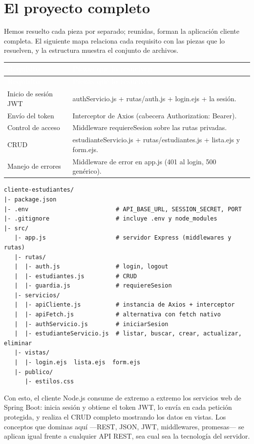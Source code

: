 \documentclass[11pt]{article}
\begin{document}
\section{El proyecto completo}
Hemos resuelto cada pieza por separado; reunidas, forman la aplicación cliente completa. El siguiente mapa relaciona cada requisito con las piezas que lo resuelven, y la estructura muestra el conjunto de archivos.

{\renewcommand{\arraystretch}{1.25}
\begin{longtable}{>{\raggedright\arraybackslash}p{3.6cm} >{\raggedright\arraybackslash}p{11.8cm}}
\rowcolor{ndverde}\textcolor{white}{\textbf{Requisito}} & \textcolor{white}{\textbf{Piezas que lo resuelven}} \\
\endfirsthead
\rowcolor{ndverde}\textcolor{white}{\textbf{Requisito}} & \textcolor{white}{\textbf{Piezas que lo resuelven}} \\
\endhead
\ttfamily\color{ndverde}Inicio de sesión JWT & authServicio.js + rutas/auth.js + login.ejs + la sesión. \\ \hline
\ttfamily\color{ndverde}Envío del token & Interceptor de Axios (cabecera Authorization: Bearer). \\ \hline
\ttfamily\color{ndverde}Control de acceso & Middleware requiereSesion sobre las rutas privadas. \\ \hline
\ttfamily\color{ndverde}CRUD & estudianteServicio.js + rutas/estudiantes.js + lista.ejs y form.ejs. \\ \hline
\ttfamily\color{ndverde}Manejo de errores & Middleware de error en app.js (401 al login, 500 genérico). \\ \hline
\end{longtable}}

\begin{cajacodigo}
\begin{lstlisting}[style=markup]
cliente-estudiantes/
|- package.json
|- .env                         # API_BASE_URL, SESSION_SECRET, PORT
|- .gitignore                   # incluye .env y node_modules
|- src/
   |- app.js                    # servidor Express (middlewares y rutas)
   |- rutas/
   |  |- auth.js                # login, logout
   |  |- estudiantes.js         # CRUD
   |  |- guardia.js             # requiereSesion
   |- servicios/
   |  |- apiCliente.js          # instancia de Axios + interceptor
   |  |- apiFetch.js            # alternativa con fetch nativo
   |  |- authServicio.js        # iniciarSesion
   |  |- estudianteServicio.js  # listar, buscar, crear, actualizar, eliminar
   |- vistas/
   |  |- login.ejs  lista.ejs  form.ejs
   |- publico/
      |- estilos.css
\end{lstlisting}
\end{cajacodigo}
\vspace{2pt}
Con esto, el cliente Node.js consume de extremo a extremo los servicios web de Spring Boot: inicia sesión y obtiene el token JWT, lo envía en cada petición protegida, y realiza el CRUD completo mostrando los datos en vistas. Los conceptos que dominas aquí —REST, JSON, JWT, middlewares, promesas— se aplican igual frente a cualquier API REST, sea cual sea la tecnología del servidor.
\end{document}
